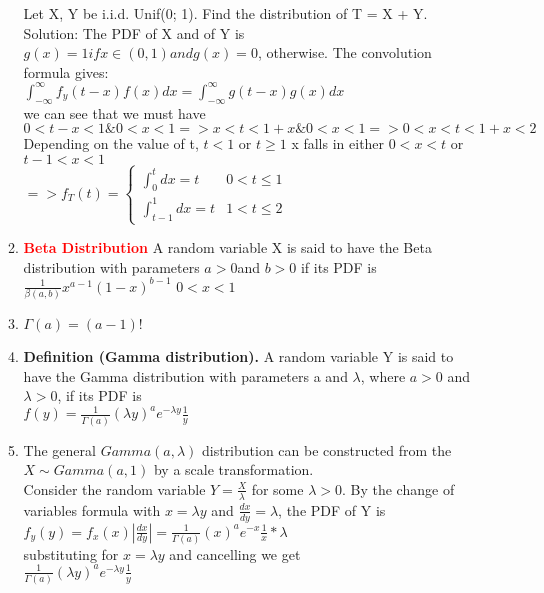 \documentclass[11pt]{article}
\begin{document}
\begin{enumerate}
\begin{enumerate}
	Let X, Y be i.i.d. Unif(0; 1). Find the distribution of T = X + Y.
	Solution: The PDF of X and of Y is $g(x) = 1 if x \in (0, 1) and g(x) = 0$, otherwise. The convolution formula gives:\\
	$\int_{-\infty}^{\infty}f_y(t-x)f(x)dx =\int_{-\infty}^{\infty}g(t-x)g(x)dx  $\\
	we can see that we must have \\
	$0<t-x<1 \& 0<x<1 => x<t<1+x \& 0 < x < 1 => 0<x<t<1+x<2$ Depending on the value of t, $t<1$ or $t\ge1$ x falls in either $0<x<t$ or $t-1<x<1$\\
	$=> f_T(t) = \begin{cases}
	\int_{0}^{t}dx = t & 0<t\le1\\
	\int_{t-1}^{1}dx = t & 1<t\le2	
	\end{cases}$\\
	\item \textcolor{red}{\textbf{Beta Distribution }} A random variable X is said to have the Beta distribution with parameters
	$a > 0 $and $b > 0$ if its PDF is\\
	$\frac{1}{\beta(a,b)} x^{a-1}(1-x)^{b-1} \, \, 0<x<1$
	\item $\Gamma(a) = (a-1)!$
	\item \textbf{Definition (Gamma distribution).} A random variable Y is said to have the Gamma distribution with parameters	a and $\lambda$, where $a > 0$ and $\lambda > 0$, if its PDF is\\
	$f(y) = \frac{1}{\Gamma(a)}(\lambda y)^ae^{-\lambda y}\frac{1}{y}$
	\item The general $Gamma(a,\lambda)$ distribution can be constructed from the $X \sim Gamma(a, 1)$ by a scale transformation. \\
	Consider the random variable $Y = \frac{X}{\lambda}$ for some $\lambda > 0$. By the change of variables formula with $x = \lambda y$ and
	$\frac{dx}{dy} = \lambda$, the PDF of Y is \\
	$f_y(y) = f_x(x)|\frac{dx}{dy}| = \frac{1}{\Gamma(a)}(x)^ae^{-x}\frac{1}{x} * \lambda $ \\
	substituting for $x=\lambda y$ and cancelling we get\\ $\frac{1}{\Gamma(a)}(\lambda y)^ae^{-\lambda y}\frac{1}{y}$ 
\end{enumerate}
\end{enumerate}
\end{document}
